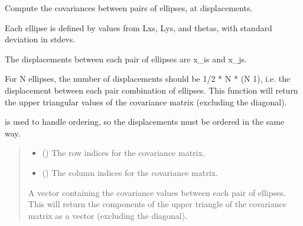 \documentclass[letterpaper,10pt,english]{sphinxmanual}
\begin{document}
\begin{fulllineitems}
\begin{quote}
\begin{description}
\begin{itemize}
\end{itemize}

\end{description}\end{quote}

\begin{fulllineitems}
\label{\detokenize{ellipse:glomar_gridding.ellipse.EllipseCovarianceBuilder.c_ij_anisotropic_array}}
\pysigstartsignatures
\pysiglinewithargsret
{}
{\sphinxparamcomma {}}
{}
\pysigstopsignatures
\sphinxAtStartPar
Compute the covariances between pairs of ellipses, at displacements.

\sphinxAtStartPar
Each ellipse is defined by values from Lxs, Lys, and thetas, with
standard deviation in stdevs.

\sphinxAtStartPar
The displacements between each pair of ellipses are x\_is and x\_js.

\sphinxAtStartPar
For N ellipses, the number of displacements should be 1/2 * N * (N \sphinxhyphen{} 1),
i.e. the displacement between each pair combination of ellipses. This
function will return the upper triangular values of the covariance
matrix (excluding the diagonal).

\sphinxAtStartPar
{} is used to handle ordering, so the
displacements must be ordered in the same way.
\begin{quote}\begin{description}
\begin{itemize}
\item {}
\sphinxAtStartPar
{} () \textendash{} The row indices for the covariance matrix.

\item {}
\sphinxAtStartPar
{} () \textendash{} The column indices for the covariance matrix.

\end{itemize}

\sphinxAtStartPar
{} \textendash{} A vector containing the covariance values between each pair of
ellipses. This will return the components of the upper triangle of
the covariance matrix as a vector (excluding the diagonal).


\end{description}
\end{quote}
\end{fulllineitems}
\end{fulllineitems}
\end{document}
